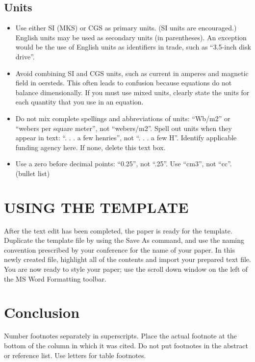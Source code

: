 \documentclass[journal,onecolumn]{IEEEtran}
\begin{document}
\subsection{Units}
\begin{itemize}
	\item Use either SI (MKS) or CGS as primary units. (SI units are encouraged.) English units may be used as secondary units (in parentheses). An exception would be the use of English units as identifiers in trade, such as “3.5-inch disk drive”.
	\item Avoid combining SI and CGS units, such as current in amperes and magnetic field in oersteds. This often leads to confusion because equations do not balance dimensionally. If you must use mixed units, clearly state the units for each quantity that you use in an equation.
	\item Do not mix complete spellings and abbreviations of units: “Wb/m2” or “webers per square meter”, not “webers/m2”.  Spell out units when they appear in text: “. . . a few henries”, not “. . . a few H”. Identify applicable funding agency here. If none, delete this text box.
	\item  Use a zero before decimal points: “0.25”, not “.25”. Use “cm3”, not “cc”. (bullet list)
\end{itemize}
\section{USING THE TEMPLATE}
After the text edit has been completed, the paper is ready for the template. Duplicate the template file by using the Save As command, and use the naming convention prescribed by your conference for the name of your paper. In this newly created file, highlight all of the contents and import your prepared text file. You are now ready to style your paper; use the scroll down window on the left of the MS Word Formatting toolbar.
\section{Conclusion}
Number footnotes separately in superscripts. Place the actual footnote at the bottom of the column in which it was cited. Do not put footnotes in the abstract or reference list. Use letters for table footnotes.
	
\end{document}
